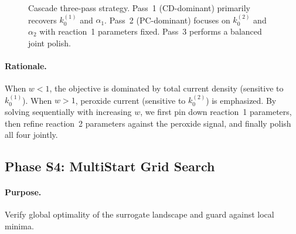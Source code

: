 \documentclass[11pt,a4paper]{article}
\newcommand{\kzero}{k_0}
\begin{document}
\begin{figure}[H]
\centering
{}
\caption{Cascade three-pass strategy. Pass~1 (CD-dominant) primarily
  recovers $\kzero^{(1)}$ and $\alpha_1$. Pass~2 (PC-dominant) focuses
  on $\kzero^{(2)}$ and $\alpha_2$ with reaction~1 parameters fixed.
  Pass~3 performs a balanced joint polish.}
\label{fig:cascade}
\end{figure}

\paragraph{Rationale.}
When $w < 1$, the objective is dominated by total current density
(sensitive to $\kzero^{(1)}$). When $w > 1$, peroxide current
(sensitive to $\kzero^{(2)}$) is emphasized. By solving sequentially
with increasing $w$, we first pin down reaction~1 parameters, then
refine reaction~2 parameters against the peroxide signal, and finally
polish all four jointly.

\subsection{Phase S4: MultiStart Grid Search}\label{sec:multistart}

\paragraph{Purpose.} Verify global optimality of the surrogate landscape
and guard against local minima.
\end{document}
